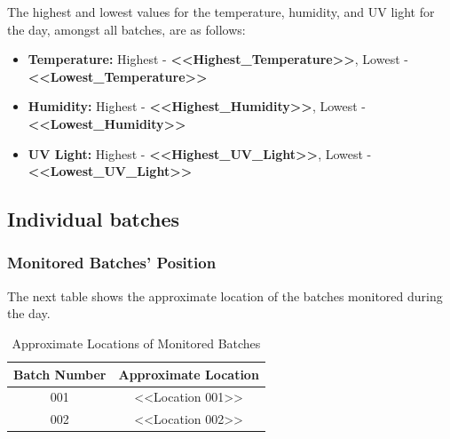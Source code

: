 \documentclass[daily]{engenius}
\begin{document}
The highest and lowest values for the temperature, humidity, and UV light for the day, amongst all batches, are as follows:

\begin{itemize}
    \item \textbf{Temperature:} Highest - \textbf{<<Highest\_Temperature>>}, Lowest - \textbf{<<Lowest\_Temperature>>}
    \item \textbf{Humidity:} Highest - \textbf{<<Highest\_Humidity>>}, Lowest - \textbf{<<Lowest\_Humidity>>}
    \item \textbf{UV Light:} Highest - \textbf{<<Highest\_UV\_Light>>}, Lowest - \textbf{<<Lowest\_UV\_Light>>}
\end{itemize}


\subsection{Individual batches}

\subsubsection{Monitored Batches' Position}

The next table shows the approximate location of the batches monitored during the day.

\begin{table}[ht]
    \centering
    \begin{tabular}{|c|c|}
        \hline
        \textbf{Batch Number} & \textbf{Approximate Location} \\
        \hline
        001 & <<Location 001>> \\
        002 & <<Location 002>> \\
        \hline
    \end{tabular}
    \caption{Approximate Locations of Monitored Batches}
    \label{tab:batch_positions}
\end{table}



\end{document}
